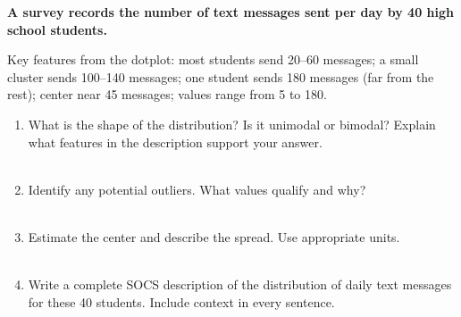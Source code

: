 \documentclass[10pt]{article}
\begin{document}
\begin{practicebox}
\small
\textbf{A survey records the number of text messages sent per day by
40 high school students.}

Key features from the dotplot: most students send 20--60 messages; a small
cluster sends 100--140 messages; one student sends 180 messages (far from the
rest); center near 45 messages; values range from 5 to 180.

\vspace{8pt}
\begin{enumerate}[leftmargin=1.5em, itemsep=8pt]
  \item What is the shape of the distribution? Is it unimodal or bimodal?
        Explain what features in the description support your answer.\\[6pt]
        \writeline\\[1pt]\writeline

  \item Identify any potential outliers. What values qualify and why?\\[6pt]
        \writeline\\[1pt]\writeline

  \item Estimate the center and describe the spread. Use appropriate units.\\[6pt]
        \writeline\\[1pt]\writeline

  \item Write a complete SOCS description of the distribution of daily text
        messages for these 40 students. Include context in every sentence.\\[6pt]
        \writeline\\[1pt]\writeline\\[1pt]\writeline\\[1pt]\writeline
\end{enumerate}
\end{practicebox}

\vspace{0.1in}
\end{document}
